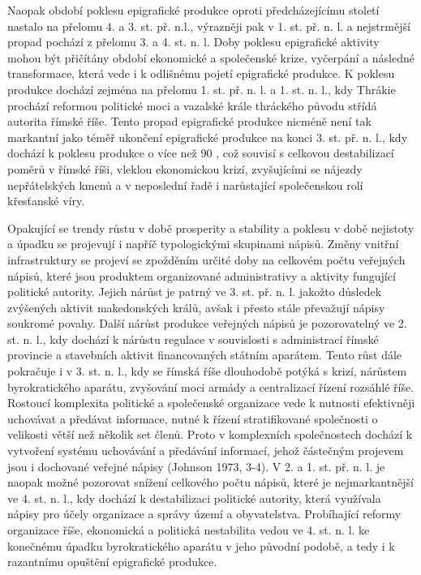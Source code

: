 Naopak období poklesu epigrafické produkce oproti předcházejícímu století nastalo na přelomu 4. a 3. st. př. n.l., výrazněji pak v 1. st. př. n. l. a nejstrmější propad pochází z přelomu 3. a 4. st. n. l. Doby poklesu epigrafické aktivity mohou být přičítány období ekonomické a společenské krize, vyčerpání a následné transformace, která vede i k odlišnému pojetí epigrafické produkce. K poklesu produkce dochází zejména na přelomu 1. st. př. n. l. a 1. st. n. l., kdy Thrákie prochází reformou politické moci a vazalské krále thráckého původu střídá autorita římské říše. Tento propad epigrafické produkce nicméně není tak markantní jako téměř ukončení epigrafické produkce na konci 3. st. př. n. l., kdy dochází k poklesu produkce o více než 90 , což souvisí s celkovou destabilizací poměrů v římské říši, vleklou ekonomickou krizí, zvyšujícími se nájezdy nepřátelských kmenů a v neposlední řadě i narůstající společenskou rolí křesťanské víry.

Opakující se trendy růstu v době prosperity a stability a poklesu v době nejistoty a úpadku se projevují i napříč typologickými skupinami nápisů. Změny vnitřní infrastruktury se projeví se zpožděním určité doby na celkovém počtu veřejných nápisů, které jsou produktem organizované administrativy a aktivity fungující politické autority. Jejich nárůst je patrný ve 3. st. př. n. l. jakožto důsledek zvýšených aktivit makedonských králů, avšak i přesto stále převažují nápisy soukromé povahy. Další nárůst produkce veřejných nápisů je pozorovatelný ve 2. st. n. l., kdy dochází k nárůstu regulace v souvislosti s administrací římské provincie a stavebních aktivit financovaných státním aparátem. Tento růst dále pokračuje i v 3. st. n. l., kdy se římská říše dlouhodobě potýká s krizí, nárůstem byrokratického aparátu, zvyšování moci armády a centralizací řízení rozsáhlé říše. Rostoucí komplexita politické a společenské organizace vede k nutnosti efektivněji uchovávat a předávat informace, nutné k řízení stratifikované společnosti o velikosti větší než několik set členů. Proto v komplexních společnostech dochází k vytvoření systému uchovávání a předávání informací, jehož částečným projevem jsou i dochované veřejné nápisy (Johnson 1973, 3-4). V 2. a 1. st. př. n. l. je naopak možné pozorovat snížení celkového počtu nápisů, které je nejmarkantnější ve 4. st. n. l., kdy dochází k destabilizaci politické autority, která využívala nápisy pro účely organizace a správy území a obyvatelstva. Probíhající reformy organizace říše, ekonomická a politická nestabilita vedou ve 4. st. n. l. ke konečnému úpadku byrokratického aparátu v jeho původní podobě, a tedy i k razantnímu opuštění epigrafické produkce.

